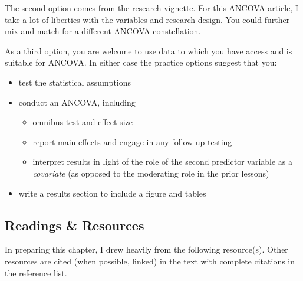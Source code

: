 \documentclass[
  11pt,
]{book}
\providecommand{\tightlist}{%
  \setlength{\itemsep}{0pt}\setlength{\parskip}{0pt}}
\begin{document}
The second option comes from the research vignette. For this ANCOVA article, I take a lot of liberties with the variables and research design. You could further mix and match for a different ANCOVA constellation.

As a third option, you are welcome to use data to which you have access and is suitable for ANCOVA. In either case the practice options suggest that you:

\begin{itemize}
\tightlist
\item
  test the statistical assumptions
\item
  conduct an ANCOVA, including

  \begin{itemize}
  \tightlist
  \item
    omnibus test and effect size
  \item
    report main effects and engage in any follow-up testing
  \item
    interpret results in light of the role of the second predictor variable as a \emph{covariate} (as opposed to the moderating role in the prior lessons)
  \end{itemize}
\item
  write a results section to include a figure and tables
\end{itemize}

\hypertarget{readings-resources-8}{%
\subsection{Readings \& Resources}\label{readings-resources-8}}

In preparing this chapter, I drew heavily from the following resource(s). Other resources are cited (when possible, linked) in the text with complete citations in the reference list.
\end{document}
